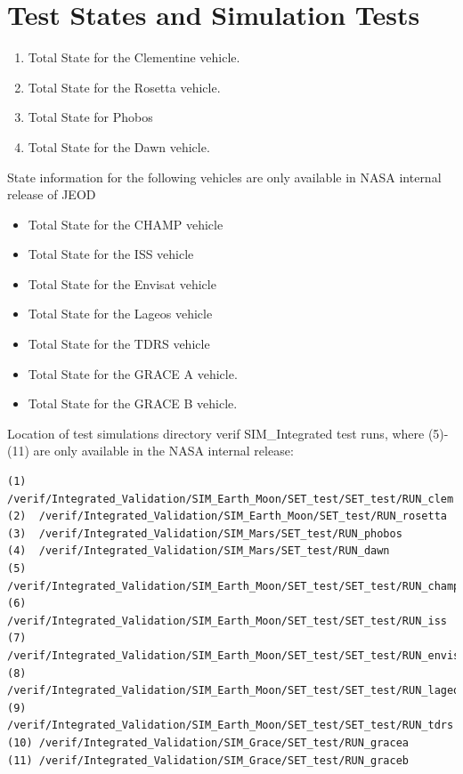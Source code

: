 %
%
%
%
% 

\chapter{Test States and Simulation Tests}\label{ap:tdata}
\begin{enumerate}
\item Total State for the Clementine vehicle.
\item Total State for the Rosetta vehicle.
\item Total State for Phobos
\item Total State for the Dawn vehicle.
\end{enumerate}

State information for the following vehicles are only available in NASA internal release of JEOD
\begin{itemize}
\item Total State for the CHAMP vehicle
\item Total State for the ISS vehicle
\item Total State for the Envisat vehicle
\item Total State for the Lageos vehicle
\item Total State for the TDRS vehicle
\item Total State for the GRACE A vehicle.
\item Total State for the GRACE B vehicle.
\end{itemize}

Location of test simulations directory verif SIM\_Integrated test runs,
where (5)-(11) are only available in the NASA internal release:
\begin{verbatim}
(1)  /verif/Integrated_Validation/SIM_Earth_Moon/SET_test/SET_test/RUN_clem
(2)  /verif/Integrated_Validation/SIM_Earth_Moon/SET_test/RUN_rosetta
(3)  /verif/Integrated_Validation/SIM_Mars/SET_test/RUN_phobos
(4)  /verif/Integrated_Validation/SIM_Mars/SET_test/RUN_dawn
(5)  /verif/Integrated_Validation/SIM_Earth_Moon/SET_test/SET_test/RUN_champ
(6)  /verif/Integrated_Validation/SIM_Earth_Moon/SET_test/SET_test/RUN_iss
(7)  /verif/Integrated_Validation/SIM_Earth_Moon/SET_test/SET_test/RUN_envisat
(8)  /verif/Integrated_Validation/SIM_Earth_Moon/SET_test/SET_test/RUN_lageos
(9)  /verif/Integrated_Validation/SIM_Earth_Moon/SET_test/SET_test/RUN_tdrs
(10) /verif/Integrated_Validation/SIM_Grace/SET_test/RUN_gracea
(11) /verif/Integrated_Validation/SIM_Grace/SET_test/RUN_graceb
\end{verbatim}


